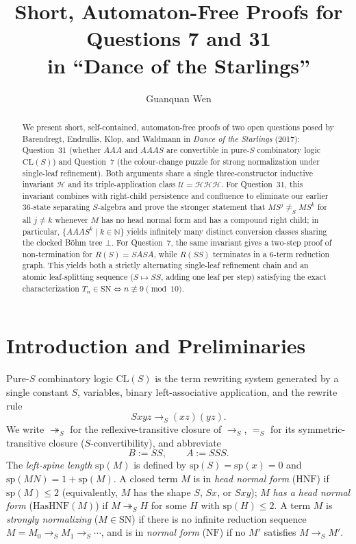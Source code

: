 \documentclass[11pt,reqno]{amsart}
\title[Short Proofs for Questions 7 and 31 in ``Dance of the Starlings'']{Short, Automaton-Free Proofs for Questions 7 and 31\\in ``Dance of the Starlings''}
\author{Guanquan Wen}
\theoremstyle{definition}
\theoremstyle{remark}
\newcommand{\CLS}{\mathrm{CL}(S)}
\newcommand{\SN}{\mathrm{SN}}
\newcommand{\HNF}{\mathrm{HNF}}
\newcommand{\NF}{\mathrm{NF}}
\newcommand{\toS}{\to_S}
\newcommand{\redS}{\twoheadrightarrow_S}
\newcommand{\convS}{=_S}
\begin{document}
\begin{abstract}
We present short, self-contained, automaton-free proofs of two open questions posed by Barendregt, Endrullis, Klop, and Waldmann in \emph{Dance of the Starlings} (2017): Question~31 (whether $A A A$ and $A A A S$ are convertible in pure-$S$ combinatory logic $\CLS$) and Question~7 (the colour-change puzzle for strong normalization under single-leaf refinement). Both arguments share a single three-constructor inductive invariant $\mathcal{H}$ and its triple-application class $\mathcal{U} = \mathcal{H}\mathcal{H}\mathcal{H}$. For Question~31, this invariant combines with right-child persistence and confluence to eliminate our earlier $36$-state separating $S$-algebra and prove the stronger statement that $M S^j \neq_S M S^k$ for all $j \neq k$ whenever $M$ has no head normal form and has a compound right child; in particular, $\{A A A S^k \mid k \in \mathbb{N}\}$ yields infinitely many distinct conversion classes sharing the clocked B\"ohm tree $\bot$. For Question~7, the same invariant gives a two-step proof of non-termination for $R(S) = S A S A$, while $R(S S)$ terminates in a $6$-term reduction graph. This yields both a strictly alternating single-leaf refinement chain and an atomic leaf-splitting sequence ($S \mapsto S S$, adding one leaf per step) satisfying the exact characterization $T_n \in \SN \iff n \not\equiv 9 \pmod{10}$.
\end{abstract}

\maketitle

\section{Introduction and Preliminaries}\label{sec:intro}

Pure-$S$ combinatory logic $\CLS$ is the term rewriting system generated by a single constant $S$, variables, binary left-associative application, and the rewrite rule
\[
  S x y z \toS (x z)(y z).
\]
We write $\redS$ for the reflexive-transitive closure of $\toS$, $\convS$ for its symmetric-transitive closure ($S$-convertibility), and abbreviate
\[
  B := S S, \qquad A := S S S.
\]
The \emph{left-spine length} $\mathrm{sp}(M)$ is defined by $\mathrm{sp}(S) = \mathrm{sp}(x) = 0$ and $\mathrm{sp}(M N) = 1 + \mathrm{sp}(M)$. A closed term $M$ is in \emph{head normal form} ($\HNF$) if $\mathrm{sp}(M) \le 2$ (equivalently, $M$ has the shape $S$, $S x$, or $S x y$); $M$ \emph{has a head normal form} ($\mathrm{HasHNF}(M)$) if $M \redS H$ for some $H$ with $\mathrm{sp}(H) \le 2$. A term $M$ is \emph{strongly normalizing} ($M \in \SN$) if there is no infinite reduction sequence $M = M_0 \toS M_1 \toS \cdots$, and is in \emph{normal form} ($\NF$) if no $M'$ satisfies $M \toS M'$.
\end{document}
